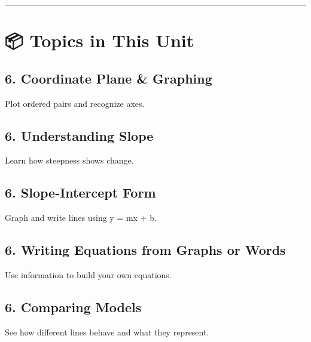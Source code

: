 \documentclass[
  letterpaper,
  DIV=11,
  numbers=noendperiod]{scrreprt}
\begin{document}
\begin{center}\rule{0.5\linewidth}{0.5pt}\end{center}

\section*{📦 Topics in This Unit}\label{topics-in-this-unit-5}


\subsection*{6. Coordinate Plane \&
Graphing}\label{coordinate-plane-graphing}

Plot ordered pairs and recognize axes.

\subsection*{6. Understanding Slope}\label{understanding-slope}

Learn how steepness shows change.

\subsection*{6. Slope-Intercept Form}\label{slope-intercept-form}

Graph and write lines using y = mx + b.

\subsection*{6. Writing Equations from Graphs or
Words}\label{writing-equations-from-graphs-or-words}

Use information to build your own equations.

\subsection*{6. Comparing Models}\label{comparing-models}

See how different lines behave and what they represent.
\end{document}
